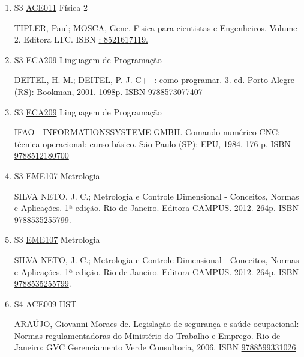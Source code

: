 \documentclass[12pt,a4paper]{book}
\begin{document}
\begin{enumerate}
 
 
 \item S3 \hyperref[PUD:ACE011]{ACE011} Física 2

  TIPLER, Paul;  MOSCA, Gene.  Fisica para cientistas e Engenheiros.  Volume 2.  Editora LTC.  ISBN \href{http://www.google.com/search?hl=pt-BR&tbo=p&tbm=bks&q=isbn:: 8521617119.&num=10}{: 8521617119.}
 \item S3 \hyperref[PUD:ECA209]{ECA209} Linguagem de Programação

 DEITEL, H.  M.;  DEITEL, P.  J.  C++: como programar.  3. ed.  Porto Alegre (RS): Bookman, 2001.  1098p.  ISBN \href{http://www.bn.br/site/pages/servicosProfissionais/agenciaISBN/isbnBusca/FbnBuscaISBNCatalogo.asp?pField=ISBN&pIntPagina=1&pISBN=73077407&nidbISBN=true&hidbISBN=true}{9788573077407}

 
 
 \item S3 \hyperref[PUD:ECA209]{ECA209} Linguagem de Programação

 IFAO - INFORMATIONSSYSTEME GMBH.  Comando numérico CNC: técnica operacional: curso básico.  São Paulo (SP): EPU, 1984.  176 p.  ISBN \href{http://www.bn.br/site/pages/servicosProfissionais/agenciaISBN/isbnBusca/FbnBuscaISBNCatalogo.asp?pField=ISBN&pIntPagina=1&pISBN=12180700&nidbISBN=true&hidbISBN=true}{9788512180700}

 
 
 \item S3 \hyperref[PUD:EME107]{EME107} Metrologia

 SILVA NETO, J.  C.;  Metrologia e Controle Dimensional - Conceitos, Normas e Aplicações.  1ª edição.  Rio de Janeiro.  Editora CAMPUS.  2012.  264p.  ISBN \href{http://www.bn.br/site/pages/servicosProfissionais/agenciaISBN/isbnBusca/FbnBuscaISBNCatalogo.asp?pField=ISBN&pIntPagina=1&pISBN=35255799&nidbISBN=true&hidbISBN=true}{9788535255799}.
 \item S3 \hyperref[PUD:EME107]{EME107} Metrologia

 SILVA NETO, J.  C.;  Metrologia e Controle Dimensional - Conceitos, Normas e Aplicações.  1ª edição.  Rio de Janeiro.  Editora CAMPUS.  2012.  264p.  ISBN \href{http://www.bn.br/site/pages/servicosProfissionais/agenciaISBN/isbnBusca/FbnBuscaISBNCatalogo.asp?pField=ISBN&pIntPagina=1&pISBN=35255799&nidbISBN=true&hidbISBN=true}{9788535255799}.
 \item S4 \hyperref[PUD:ACE009]{ACE009} HST

  ARAÚJO, Giovanni Moraes de.  Legislação de segurança e saúde ocupacional: Normas regulamentadoras do Ministério do Trabalho e Emprego.  Rio de Janeiro: GVC Gerenciamento Verde Consultoria, 2006.  ISBN \href{http://www.bn.br/site/pages/servicosProfissionais/agenciaISBN/isbnBusca/FbnBuscaISBNCatalogo.asp?pField=ISBN&pIntPagina=1&pISBN=99331026&nidbISBN=true&hidbISBN=true}{9788599331026}
 

\end{enumerate}
\end{document}

